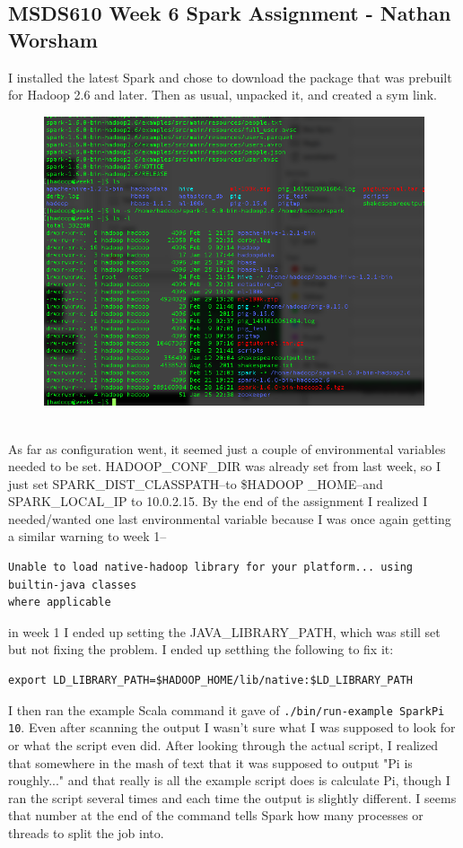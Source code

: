 \documentclass[10pt]{article}
\begin{document}
\subsection*{MSDS610 Week 6 Spark Assignment - Nathan Worsham}
I installed the latest Spark and chose to download the package that was prebuilt for Hadoop 2.6 and later. Then as usual, unpacked it, and created a sym link.
\begin{figure}[!h]
\includegraphics[scale=0.37]{install.png}
\centering
\end{figure}\\
\indent As far as configuration went, it seemed just a couple of environmental variables needed to be set. HADOOP\_CONF\_DIR was already set from last week, so I just set SPARK\_DIST\_CLASSPATH--to \$HADOOP
\_HOME--and SPARK\_LOCAL\_IP to 10.0.2.15. By the end of the assignment I realized I needed/wanted one last environmental variable because I was once again getting a similar warning to week 1--
\begin{verbatim}
Unable to load native-hadoop library for your platform... using builtin-java classes 
where applicable
\end{verbatim}
in week 1 I ended up setting the JAVA\_LIBRARY\_PATH, which was still set but not fixing the problem. I ended up setthing the following to fix it:
\begin{verbatim}
export LD_LIBRARY_PATH=$HADOOP_HOME/lib/native:$LD_LIBRARY_PATH
\end{verbatim}
\indent I then ran the example Scala command it gave of \verb|./bin/run-example SparkPi 10|. Even after scanning the output I wasn't sure what I was supposed to look for or what the script even did. After looking through the actual script, I realized that somewhere in the mash of text that it was supposed to output "Pi is roughly..." and that really is all the example script does is calculate Pi, though I ran the script several times and each time the output is slightly different. I seems that number at the end of the command tells Spark how many processes or threads to split the job into. 
\end{document}
